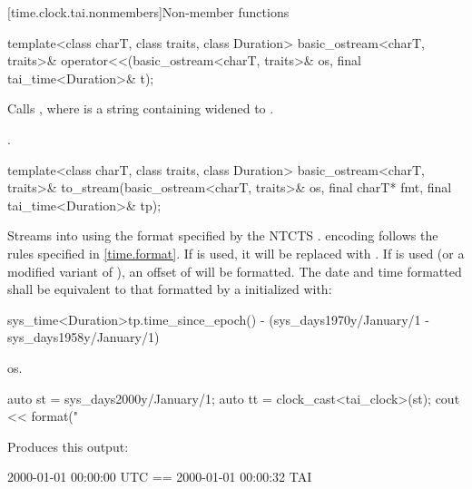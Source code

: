 [time.clock.tai.nonmembers]{Non-member functions}

%
\begin{itemdecl}
template<class charT, class traits, class Duration>
  basic_ostream<charT, traits>&
    operator<<(basic_ostream<charT, traits>& os, final tai_time<Duration>& t);
\end{itemdecl}

\begin{itemdescr}
\pnum
\effects
Calls ,
where  is a string containing
 widened to .

\pnum
\returns {}.
\end{itemdescr}

%
\begin{itemdecl}
template<class charT, class traits, class Duration>
  basic_ostream<charT, traits>&
    to_stream(basic_ostream<charT, traits>& os, final charT* fmt, final tai_time<Duration>& tp);
\end{itemdecl}

\begin{itemdescr}
\pnum
\effects
Streams  into  using
the format specified by the NTCTS .
 encoding follows the rules specified in \ref{time.format}.
If  is used, it will be replaced with .
If  is used (or a modified variant of ),
an offset of  will be formatted.
The date and time formatted shall be equivalent to
that formatted by a  initialized with:
\begin{codeblock}
sys_time<Duration>{tp.time_since_epoch()} -
  (sys_days{1970y/January/1} - sys_days{1958y/January/1})
\end{codeblock}

\pnum
\returns os.

\pnum
\begin{example}
\begin{codeblock}
auto st = sys_days{2000y/January/1};
auto tt = clock_cast<tai_clock>(st);
cout << format("%
\end{codeblock}

Produces this output:

\begin{codeblock}
2000-01-01 00:00:00 UTC == 2000-01-01 00:00:32 TAI
\end{codeblock}
\end{example}
\end{itemdescr}

